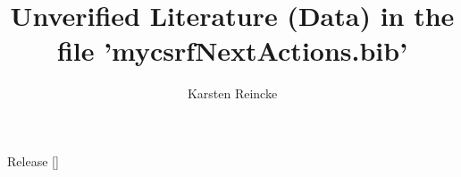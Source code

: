 \documentclass[DIV=calc,BCOR=5mm,11pt,headings=small,oneside,abstract=true,toc=bib]{scrartcl}
\begin{document}
\nocite{*}

\subject{mind your Classical scholar research framework}
\title{Unverified Literature (Data) in the file 'mycsrfNextActions.bib'}
\author{Karsten Reincke}

\maketitle
Release []

\small



\end{document}
